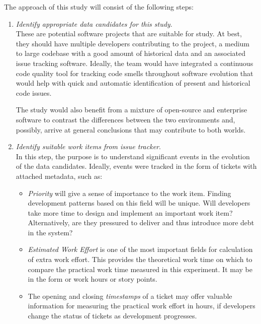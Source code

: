 The approach of this study will consist of the following steps:
\begin{enumerate}
	\item \textit{Identify appropriate data candidates for this study}.\\
	      These are potential software projects that are suitable for study.
	      At best, they should have multiple developers contributing to the
	      project, a medium to large codebase with a good amount of historical
	      data and an associated issue tracking software. Ideally, the team
	      would have integrated a continuous code quality tool for tracking
	      code smells throughout software evolution that would help with quick
	      and automatic identification of present and historical code issues.

	      The study would also benefit from a mixture of open-source and
	      enterprise software to contrast the differences between the two
	      environments and, possibly, arrive at general conclusions that may
	      contribute to both worlds.

	\item \textit{Identify suitable work items from issue tracker}.\\
	      In this step, the purpose is to understand significant events in the
	      evolution of the data candidates. Ideally, events were tracked in the
	      form of tickets with attached metadata, such as:
	      \begin{itemize}
		      \item \textit{Priority} will give a sense of importance to the work item.
		            Finding development patterns based on this field will be unique.
		            Will developers take more time to design and implement an
		            important work item? Alternatively, are they pressured to deliver
		            and thus introduce more debt in the system?
		      \item \textit{Estimated Work Effort} is one of the most important
		            fields for calculation of extra work effort. This provides the
		            theoretical work time on which to compare the practical work time
		            measured in this experiment. It may be in the form or work hours
		            or story points.
		      \item The opening and closing \textit{timestamps} of a ticket may
		            offer valuable information for measuring the practical work effort
		            in hours, if developers change the status of tickets as
		            development progresses.
	      \end{itemize}


\end{enumerate}
